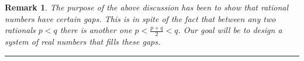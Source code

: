 \documentclass[10pt,varwidth=6in,margin=0.2in,preview]{standalone}
\newtheorem{remark}[definition]{Remark}
\begin{document}
\begin{flushleft}
\setcounter{section}{1}
\setcounter{definition}{1}
\begin{remark}
The purpose of the above discussion has been to show that rational numbers have certain gaps. This is in spite of the fact that between any two rationals $p < q$ there is another one $p < \frac{p + q}{2} < q$. Our goal will be to design a system of real numbers that fills these gaps.
\end{remark}



\vspace{4in}

\hrule

\end{flushleft}
\end{document}
